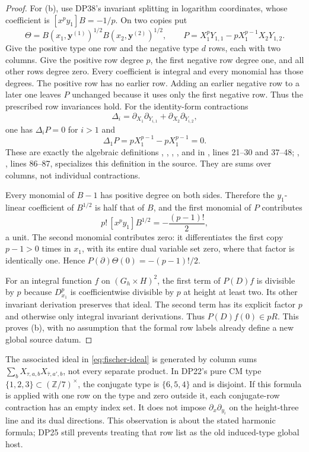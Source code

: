 \documentclass[11pt,a4paper]{article}
\theoremstyle{definition}\newtheorem{remark}[theorem]{Remark}
\newcommand{\Z}{\mathbb Z}\newcommand{\Q}{\mathbb Q}\newcommand{\F}{\mathbb F}
\begin{document}
\begin{proof}
For (b), use DP38's invariant splitting in logarithm coordinates, whose coefficient is $[x^py_1]B=-1/p$. On two copies put
\[
 \Theta=B(x_1,\mathbf y^{(1)})^{1/2}B(x_2,\mathbf y^{(2)})^{1/2},\qquad
 P=X_1^pY_{1,1}-pX_1^{p-1}X_2Y_{1,2}.
\]
Give the positive type one row and the negative type $d$ rows, each with two columns. Give the positive row degree $p$, the first negative row degree one, and all other rows degree zero. Every coefficient is integral and every monomial has those degrees. The positive row has no earlier row. Adding an earlier negative row to a later one leaves $P$ unchanged because it uses only the first negative row. Thus the prescribed row invariances hold. For the identity-form contractions
\[
 \Delta_i=\partial_{X_1}\partial_{Y_{i,1}}+
          \partial_{X_2}\partial_{Y_{i,2}},
\]
one has $\Delta_iP=0$ for $i>1$ and
\[
 \Delta_1P=pX_1^{p-1}-pX_1^{p-1}=0.
\]
These are exactly the algebraic definitions , , , , and  in
,
lines 21--30 and 37--48; , , lines 86--87, specializes this definition in the source. They are sums over columns, not individual contractions.

Every monomial of $B-1$ has positive degree on both sides. Therefore the $y_1$-linear coefficient of $B^{1/2}$ is half that of $B$, and the first monomial of $P$ contributes
\[
 p!\,[x^py_1]B^{1/2}=-\frac{(p-1)!}{2},
\]
a unit. The second monomial contributes zero: it differentiates the first copy $p-1>0$ times in $x_1$, with its entire dual variable set zero, where that factor is identically one. Hence $P(\partial)\Theta(0)=-(p-1)!/2$.

For an integral function $f$ on $(G_h\times H)^2$, the first term of $P(D)f$ is divisible by $p$ because $D_{x_1}^p$ is coefficientwise divisible by $p$ at height at least two. Its other invariant derivation preserves that ideal. The second term has its explicit factor $p$ and otherwise only integral invariant derivations. Thus $P(D)f(0)\in pR$. This proves (b), with no assumption that the formal row labels already define a new global source datum.
\end{proof}

The associated ideal in \eqref{eq:fischer-ideal} is generated by column sums $\sum_bX_{\tau,a,b}X_{\bar\tau,a',b}$, not every separate product. In DP22's pure CM type $\{1,2,3\}\subset(\Z/7)^\times$, the conjugate type is $\{6,5,4\}$ and is disjoint. If this formula is applied with one row on the type and zero outside it, each conjugate-row contraction has an empty index set. It does not impose $\partial_x\partial_{y_i}$ on the height-three line and its dual directions. This observation is about the stated harmonic formula; DP25 still prevents treating that row list as the old induced-type global host.
\end{document}
